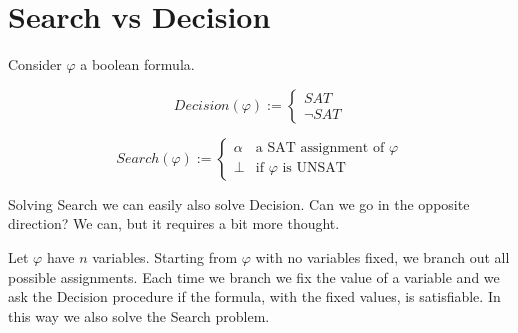 \section{Search vs Decision}\label{sec:search_decision}

Consider $\varphi$ a boolean formula.

\begin{equation}\label{eq:decision}
    Decision(\varphi) := 
    \begin{cases}
        SAT \\
        \lnot SAT
    \end{cases}
\end{equation}

\begin{equation}\label{eq:search}
    Search(\varphi) := 
    \begin{cases}
        \alpha  & \text{a SAT assignment of } \varphi\\
        \perp   & \text{if } \varphi \text{ is UNSAT}
    \end{cases}
\end{equation}

Solving Search we can easily also solve Decision. Can we go in the opposite direction?
We can, but it requires a bit more thought.

Let $\varphi$ have $n$ variables. Starting from $\varphi$ with no variables fixed, we branch out all possible assignments.
Each time we branch we fix the value of a variable and we ask the Decision procedure if the formula, with the fixed values, is satisfiable.
In this way we also solve the Search problem.